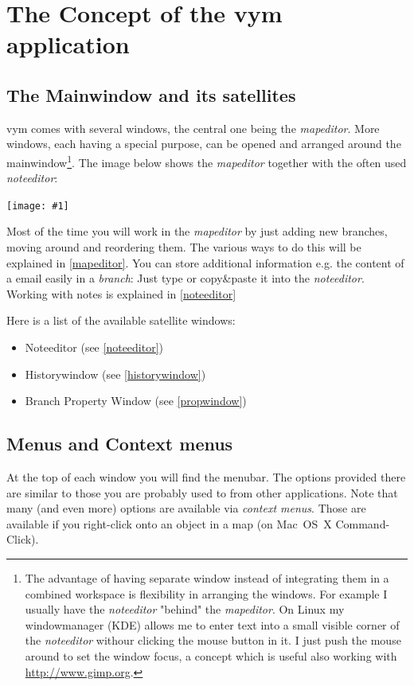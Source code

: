 \documentclass[12pt,a4paper]{article}
\newcommand{\maximage}[1]{  
    \begin{center}
        \texttt{[image: \#1]} 
    \end{center}
}
\newcommand{\vym}{{\sc vym }}
\begin{document}
\section{The Concept of the \vym application}
\subsection{The Mainwindow and its satellites} \label{satellite}
\vym comes with several windows, the central one being the {\em
mapeditor}.
More windows, each having a special purpose, can be opened and arranged
around the mainwindow\footnote{
    The advantage of having separate window instead of integrating them
    in a combined workspace is flexibility in arranging the windows. For
    example I usually have the {\em noteeditor} "behind" the {\em
    mapeditor}. On Linux my windowmanager (KDE) allows me to enter text
    into a small visible corner of the {\em noteeditor} withour clicking
    the mouse button in it. I just push the mouse around to set the
    window focus, a concept which is useful also working with 
    \href{http://www.gimp.org}{http://www.gimp.org}.
}. 
The image below shows the {\em mapeditor}
together with the often used {\em noteeditor}: 
\maximage{images/windows.png}
Most of the time you will work in the {\em mapeditor} by just adding new
branches, moving around and reordering them. The various ways to do this
will be explained in \ref{mapeditor}. You can store additional
information e.g. the content of a email easily in a {\em branch}: Just
type or copy\&paste it into the {\em noteeditor}. Working with notes is
explained in \ref{noteeditor}
 
Here is a list of the available satellite windows:
\begin{itemize}
    \item Noteeditor (see \ref {noteeditor})
    \item Historywindow (see \ref{historywindow})
    \item Branch Property Window (see \ref{propwindow})
\end{itemize}


\subsection{Menus and Context menus}
At the top of each window you will find the menubar. The options provided there
are similar to those you are probably used to from other applications. Note that
many (and even more) options are available via {\em context menus}. Those
are available if you right-click onto an object in a map (on Mac~OS~X
Command-Click).
\end{document}
